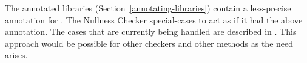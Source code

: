 The annotated libraries (Section~\ref{annotating-libraries}) contain a less-precise annotation for
.  The Nullness Checker special-cases  to
act as if it had the above annotation.  The cases that
are currently being handled are described in
.
This approach would be possible for other checkers and other methods as the
need arises.



